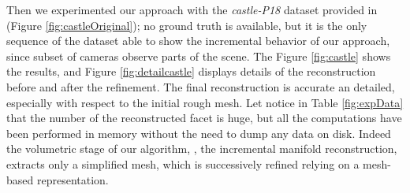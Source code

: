 Then we experimented our approach with the \emph{castle-P18} dataset provided in \cite{strecha2008} (Figure \ref{fig:castleOriginal}); no ground truth is available, but it is the only sequence of the dataset able to show the incremental behavior of our approach, since subset of cameras observe parts of the scene. 
The Figure \ref{fig:castle} shows the results, and Figure \ref{fig:detailcastle} displays details of the reconstruction before and after the refinement. The final reconstruction is accurate  an detailed, especially with respect to the initial rough mesh.
Let notice in Table \ref{fig:expData} that the number of the reconstructed facet is huge, but all the computations have been performed in memory without the need to dump any data on disk. Indeed the volumetric stage of our algorithm, \ie, the incremental manifold reconstruction, extracts only a  simplified mesh, which is successively refined relying on a mesh-based representation.


